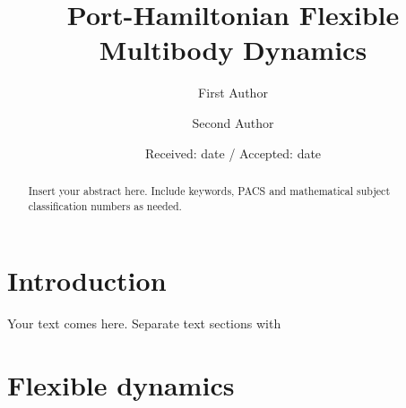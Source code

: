\makeatletter \renewcommand\d[1]{\ensuremath{%
		\;\mathrm{d}#1\@ifnextchar\d{\!}{}}}
\makeatother

\graphicspath{{./Figures/}}



\title{Port-Hamiltonian Flexible Multibody Dynamics%
}
\subtitle{}


\author{First Author         \and
        Second Author %
}



\date{Received: date / Accepted: date}


\maketitle

\begin{abstract}
Insert your abstract here. Include keywords, PACS and mathematical
subject classification numbers as needed.
\end{abstract}

\section{Introduction}
\label{intro}
Your text comes here. Separate text sections with

\section{Flexible dynamics}

